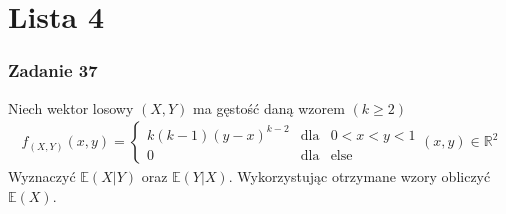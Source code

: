 \chapter*{Lista 4}


\subsection*{Zadanie 37}
Niech wektor losowy $ (X,Y) $ ma gęstość daną wzorem $ \left(k\ge 2\right) $
\begin{gather*}
f_{(X,Y)}(x,y)=\left \{
\begin{array}{cll}
	k(k-1)(y-x)^{k-2} & \text{dla} & 0<x<y<1     \\
	        0         & \text{dla} & \text{else}
\end{array}
\right .
(x,y)\in \mathbb R ^2
\end{gather*}
Wyznaczyć $ \mathbb E \left(X|Y\right) $ oraz $ \mathbb E \left(Y|X\right) $. Wykorzystując otrzymane wzory obliczyć $ \mathbb E \left(X\right) $.

